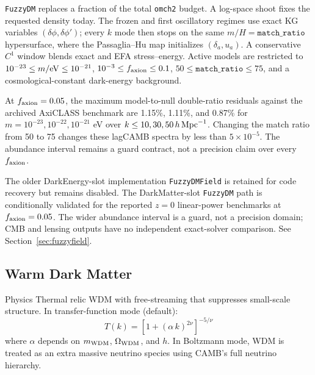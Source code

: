 \documentclass[11pt,a4paper]{article}
\begin{document}
\begin{notebox}
\texttt{FuzzyDM} replaces a fraction of the total \texttt{omch2} budget. A
log-space shoot fixes the requested density today. The frozen and first
oscillatory regimes use exact KG variables $(\delta\phi,\delta\phi')$; every
$k$ mode then stops on the same $m/H=\texttt{match\_ratio}$ hypersurface, where
the Passaglia--Hu map initializes $(\delta_a,u_a)$. A conservative $C^1$
window blends exact and EFA stress--energy. Active models are restricted to
$10^{-23}\leq m/{\rm eV}\leq10^{-21}$,
$10^{-3}\leq f_{\rm axion}\leq0.1$, $50\leq\texttt{match\_ratio}\leq75$,
and a cosmological-constant dark-energy background.

At $f_{\rm axion}=0.05$, the maximum model-to-null double-ratio residuals
against the archived AxiCLASS benchmark are 1.15\%, 1.11\%, and 0.87\% for
$m=10^{-23},10^{-22},10^{-21}$ eV over $k\leq10,30,50\,h\,{\rm Mpc}^{-1}$.
Changing the match ratio from 50 to 75 changes these lagCAMB spectra by less
than $5\times10^{-5}$. The abundance interval remains a guard contract, not a
precision claim over every $f_{\rm axion}$.

The older DarkEnergy-slot implementation \texttt{FuzzyDMField} is retained for
code recovery but remains disabled. The DarkMatter-slot \texttt{FuzzyDM} path
is conditionally validated for the reported $z=0$ linear-power benchmarks at
$f_{\rm axion}=0.05$. The wider abundance interval is a guard, not a precision
domain; CMB and lensing outputs have no independent exact-solver comparison.
See Section~\ref{sec:fuzzyfield}.
\end{notebox}


\newpage
\subsection{Warm Dark Matter}

\begin{physbox}{Physics}
Thermal relic WDM with free-streaming that suppresses small-scale structure. In transfer-function mode (default):
\begin{equation}
    T(k) = \left[1 + (\alpha\, k)^{2\nu}\right]^{-5/\nu}
\end{equation}
where $\alpha$ depends on $m_{\rm WDM}$, $\Omega_{\rm WDM}$, and $h$. In Boltzmann mode, WDM is treated as an extra massive neutrino species using CAMB's full neutrino hierarchy.
\end{physbox}
\end{document}
